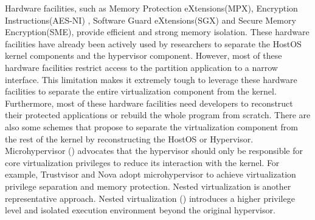 
Hardware facilities, such as Memory Protection eXtensions(MPX)\cite{ramakesavan2015intel}, Encryption Instructions(AES-NI)\cite{gueron2010intel} , Software Guard eXtensions(SGX)\cite{mckeen2016intel} and Secure Memory Encryption(SME)\cite{kaplan2016amd}, provide efficient and strong memory isolation. These hardware facilities have already been actively used by researchers to separate the HostOS kernel components and the hypervisor component. 
However, most of these hardware facilities restrict access to the partition application to a narrow interface.
This limitation makes it extremely tough to leverage these hardware facilities to separate the entire virtualization component from the kernel. Furthermore, most of these hardware facilities need developers to reconstruct their protected applications or rebuild the whole program from scratch. 
There are also some schemes that propose to separate the virtualization component from the rest of the kernel by reconstructing the HostOS or Hypervisor.
Microhypervisor (\cite{engler1995exokernel,steinberg2010nova,whitaker2002scale,liedtke1995micro,klein2009sel4,shapiro1999eros,baumann2009multikernel}) 
advocates that the hypervisor should only be responsible for core virtualization privileges to reduce its interaction with the kernel. For example, Trustvisor and Nova adopt microhypervisor to achieve virtualization privilege separation and memory protection. 
Nested virtualization is another representative approach. 
Nested virtualization (\cite{Wang2016CloudAuditorAC,REN2017137,mi2020mostly,183330,das2014nested,wasserman2013nested,yassour2008direct}) introduces a higher privilege level and isolated execution environment beyond the original hypervisor. 
